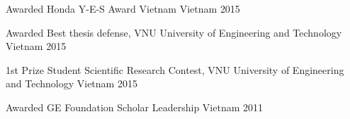 
\begin{cvhonors}

  \cvhonor
    {Awarded} %
    {Honda Y-E-S Award Vietnam} %
    {Vietnam} %
    {2015} %

  \cvhonor
    {Awarded} %
    {Best thesis defense, VNU University of Engineering and Technology} %
    {Vietnam} %
    {2015} %

  \cvhonor
    {1st Prize} %
    {Student Scientific Research Contest, VNU University of Engineering and Technology} %
    {Vietnam} %
    {2015} %

  \cvhonor
    {Awarded} %
    {GE Foundation Scholar Leadership} %
    {Vietnam} %
    {2011} %

\end{cvhonors}








